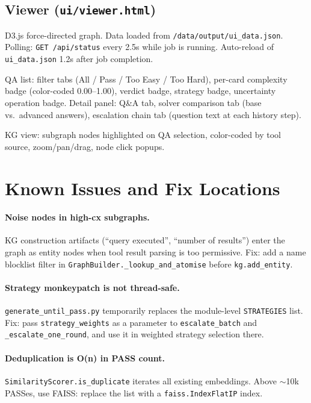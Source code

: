\documentclass[11pt,a4paper]{article}
\begin{document}
\subsection{Viewer (\texttt{ui/viewer.html})}

D3.js force-directed graph. Data loaded from \texttt{/data/output/ui\_data.json}. Polling: \texttt{GET /api/status} every 2.5s while job is running. Auto-reload of \texttt{ui\_data.json} 1.2s after job completion.

QA list: filter tabs (All / Pass / Too Easy / Too Hard), per-card complexity badge (color-coded 0.00--1.00), verdict badge, strategy badge, uncertainty operation badge. Detail panel: Q\&A tab, solver comparison tab (base vs.\ advanced answers), escalation chain tab (question text at each history step).

KG view: subgraph nodes highlighted on QA selection, color-coded by tool source, zoom/pan/drag, node click popups.

\section{Known Issues and Fix Locations}

\paragraph{Noise nodes in high-cx subgraphs.} KG construction artifacts (``query executed'', ``number of results'') enter the graph as entity nodes when tool result parsing is too permissive. Fix: add a name blocklist filter in \texttt{GraphBuilder.\_lookup\_and\_atomise} before \texttt{kg.add\_entity}.

\paragraph{Strategy monkeypatch is not thread-safe.} \texttt{generate\_until\_pass.py} temporarily replaces the module-level \texttt{STRATEGIES} list. Fix: pass \texttt{strategy\_weights} as a parameter to \texttt{escalate\_batch} and \texttt{\_escalate\_one\_round}, and use it in weighted strategy selection there.

\paragraph{Deduplication is O(n) in PASS count.} \texttt{SimilarityScorer.is\_duplicate} iterates all existing embeddings. Above $\sim$10k PASSes, use FAISS: replace the list with a \texttt{faiss.IndexFlatIP} index.
\end{document}
